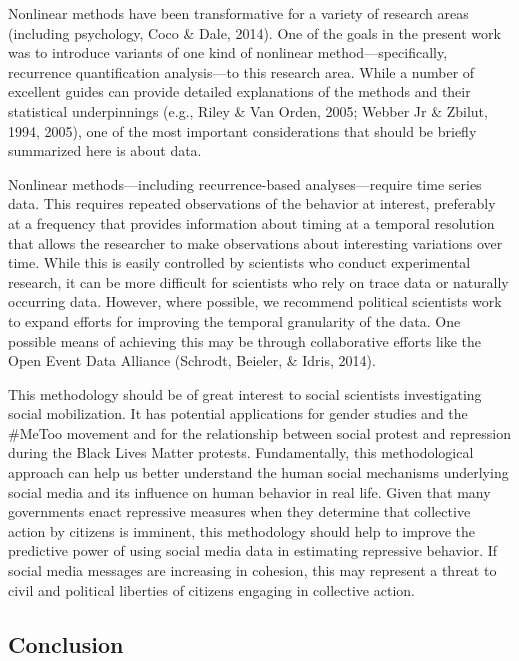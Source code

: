 \documentclass[english,man]{apa6}
\begin{document}
Nonlinear methods have been transformative for a variety of research areas
(including psychology, Coco \& Dale, 2014). One of the goals in the present work was
to introduce variants of one kind of nonlinear method---specifically, recurrence
quantification analysis---to this research area. While a number of excellent
guides can provide detailed explanations of the methods and their statistical
underpinnings (e.g., Riley \& Van Orden, 2005; Webber Jr \& Zbilut, 1994, 2005), one of the most important considerations that should be
briefly summarized here is about data.

Nonlinear methods---including recurrence-based analyses---require time series
data. This requires repeated observations of the behavior at interest,
preferably at a frequency that provides information about timing at a temporal
resolution that allows the researcher to make observations about interesting
variations over time. While this is easily controlled by scientists who conduct
experimental research, it can be more difficult for scientists who rely on trace
data or naturally occurring data. However, where possible, we recommend
political scientists work to expand efforts for improving the temporal
granularity of the data. One possible means of achieving this may be through
collaborative efforts like the Open Event Data Alliance (Schrodt, Beieler, \& Idris, 2014).

This methodology should be of great interest to social scientists investigating
social mobilization. It has potential applications for gender studies and
the \#MeToo movement and for the relationship between social protest and repression
during the Black Lives Matter protests. Fundamentally, this methodological
approach can help us better understand the human social mechanisms underlying
social media and its influence on human behavior in real life. Given that many
governments enact repressive measures when they determine that collective action
by citizens is imminent, this methodology should help to improve the predictive
power of using social media data in estimating repressive behavior. If social
media messages are increasing in cohesion, this may represent a threat to civil
and political liberties of citizens engaging in collective action.

\hypertarget{conclusion}{%
\subsection{Conclusion}\label{conclusion}}
\end{document}
